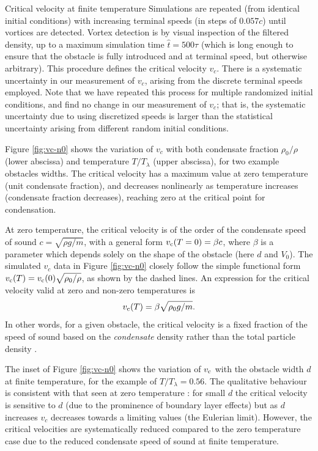 \begin{chapter}{\label{cha:nonequib}Critical velocity at finite temperature}
Simulations are repeated (from identical initial conditions) with increasing terminal speeds (in steps of $0.057c$) until vortices are detected.  Vortex detection is by visual inspection of the filtered density, up to a maximum simulation time $\hat{t}=500\tau$ (which is long enough to ensure that the obstacle is fully introduced and at terminal speed, but otherwise arbitrary). This procedure defines the critical velocity $v_c$.  There is a systematic uncertainty in our measurement of $v_c$, arising from the discrete terminal speeds employed.  Note that we have repeated this process for multiple randomized initial conditions, and find no change in our measurement of $v_c$; that is, the systematic uncertainty due to using discretized speeds is larger than the statistical uncertainty arising from different random initial conditions.

Figure \ref{fig:vc-n0} shows the variation of $v_c$ with both condensate fraction $\rho_0/\rho$ (lower abscissa) and temperature $T/T_\lambda$ (upper abscissa), for two example obstacles widths.  The critical velocity has a maximum value at zero temperature (unit condensate fraction), and decreases nonlinearly as temperature increases (condensate fraction decreases), reaching zero at the critical point for condensation.

At zero temperature, the critical velocity is of the order of the condensate speed of sound $c=\sqrt{\rho g/m}$, with a general form $v_{\rm c}(T=0)=\beta c$,
where $\beta$ is a parameter which depends solely on the shape of the
obstacle (here $d$ and $V_0$).  The simulated $v_c$ data in
Figure \ref{fig:vc-n0} closely follow the simple functional form
$v_{\rm c}(T) = v_{\rm c}(0) \sqrt{\rho_0/\rho}$, as shown by the dashed lines.
An expression for the critical velocity valid at zero and non-zero
temperatures is
\begin{equation}
v_{\rm c}(T)=\beta \sqrt{\rho_0 g/m}.
\label{eqn:finite_vc}
\end{equation}
In other words, for a given obstacle, the critical velocity is a fixed
fraction of the speed of sound based on the {\it condensate} density
rather than the total particle density \cite{leadbeater_2003}.

The inset of Figure \ref{fig:vc-n0} shows the variation of $v_{\rm c}$ with the obstacle width $d$ at finite temperature, for the example of $T/T_\lambda =0.56$.   The qualitative behaviour is consistent with that seen at zero temperature \cite{huepe00,rica2001,stagg_parker_14}: for small $d$ the critical velocity is sensitive to $d$ (due to the prominence of boundary layer effects) but as $d$ increases $v_c$ decreases towards a limiting values (the Eulerian limit).  However, the critical velocities are systematically reduced compared to the zero temperature case due to the reduced condensate speed of sound at finite temperature.



\end{chapter}
